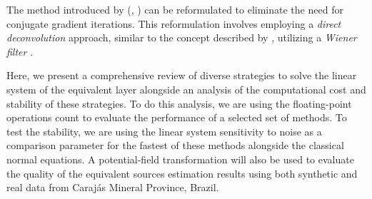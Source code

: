 The method introduced by \citeauthor{takahashi-etal2020} (\citeyear{takahashi-etal2020}, \citeyear{takahashi-etal2022}) can be reformulated to eliminate the need for conjugate gradient iterations. 
This reformulation involves employing a \textit{direct deconvolution} approach, similar to the concept described by \citep[e.g.,][p. 220]{aster_etal2019}, utilizing a \textit{Wiener filter} 
\citep[e.g.,][p. 263]{gonzalez-woods2002}.


Here, we present a comprehensive review of diverse strategies to solve the linear system of the equivalent layer alongside an analysis of the computational cost and stability of these strategies. 
To do this analysis, we are using the floating-point operations count to evaluate the performance of 
a selected set of methods. 
To test the stability, we are using the linear system sensitivity to noise as a comparison parameter for the fastest of these methods alongside the classical normal equations. 
A potential-field transformation will also be used to evaluate the quality of the equivalent sources estimation results using both synthetic and real data from Carajás Mineral Province, Brazil.



